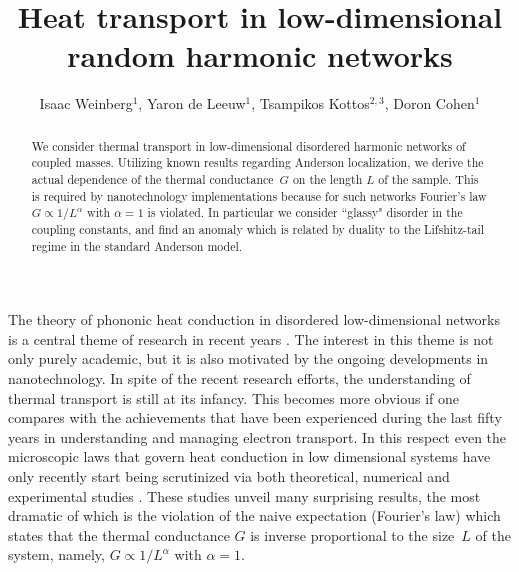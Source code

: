 \documentclass[twocolumn,showpacs,aps,pre]{revtex4-1}
\begin{document}
\title{Heat transport in low-dimensional random harmonic networks}

\author{Isaac Weinberg$^1$, Yaron de Leeuw$^1$, Tsampikos Kottos$^{2,3}$, Doron Cohen$^1$}

\begin{abstract}
We consider thermal transport in low-dimensional disordered harmonic networks of coupled masses. 
Utilizing known results regarding Anderson localization, we derive 
the actual dependence of the thermal conductance~$G$ on the length $L$ of the sample.  
This is required by nanotechnology implementations because for such networks 
Fourier's law ${G \propto 1/L^{\alpha}}$ with ${\alpha=1}$ is violated.  
%  
In particular we consider ``glassy" disorder in the coupling constants, 
and find an anomaly which is related by duality to the Lifshitz-tail regime
in the standard Anderson model. 
%
\end{abstract}


\maketitle



The theory of phononic heat conduction in disordered low-dimensional networks is a central theme of research in recent years \cite{LLP03,
D08,LRWZHL12}. The interest in this theme is not only purely academic, but it is also motivated by the ongoing developments in nanotechnology.
In spite of the recent research efforts, the understanding of thermal transport is still at its infancy. This becomes more obvious if one compares 
with the achievements that have been experienced during the last fifty years in understanding and managing electron transport. In this respect 
even the microscopic laws that govern heat conduction in low dimensional systems have only recently start being scrutinized via both theoretical, 
numerical and experimental studies \cite{LLP03,D08,COGMZ08,NGPB09,LRWZHL12,ZL10,K1,K2}. These studies unveil many surprising results, the most 
dramatic of which is the violation of the naive expectation (Fourier's law) which states that the thermal conductance $G$ is inverse proportional 
to the size~$L$ of the system, namely, $G\propto 1/L^{\alpha}$ with ${\alpha=1}$. 
\end{document}
